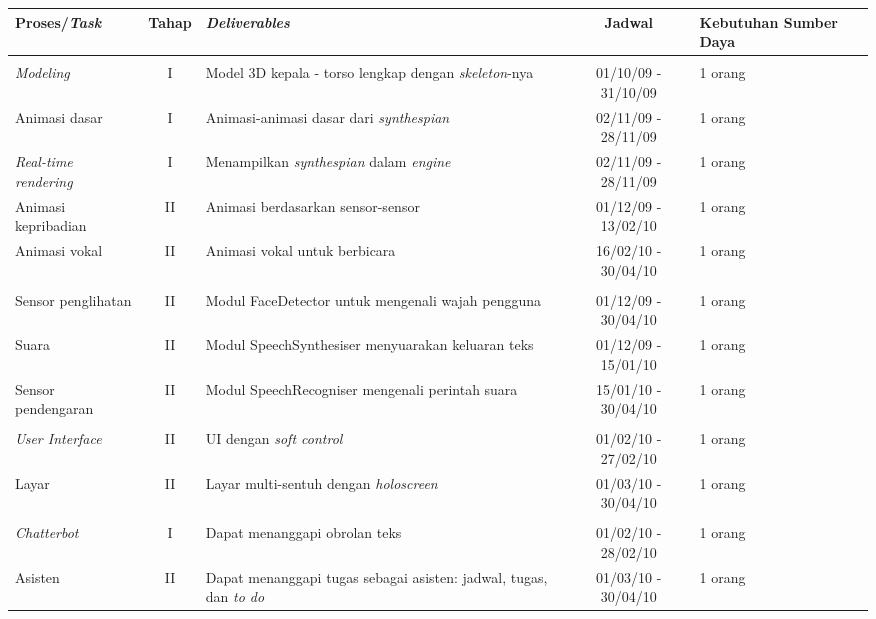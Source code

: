 \begin{table}
	\centering
		\begin{tabular}{|>{\small}l|>{\small}c|>{\small}p{4cm}|>{\small}c|>{\small}p{2cm}|}
		\hline
			\textbf{Proses\slash \textit{Task}} & 		\textbf{Tahap} & \textbf{\textit{Deliverables}} & \textbf{Jadwal} & \textbf{Kebutuhan Sumber Daya}\\
		\hline
			\multicolumn{5}{|>{\small}c|}{\textbf{\textit{Synthespian}}}\\
		\hline
			\textit{Modeling} & I & Model 3D kepala - torso lengkap dengan \textit{skeleton}-nya & 01/10/09 - 31/10/09 & 1 orang\\
		\hline
			Animasi dasar & I & Animasi-animasi dasar dari \textit{synthespian} & 02/11/09 - 28/11/09 & 1 orang\\
		\hline
			\textit{Real-time rendering} & I & Menampilkan \textit{synthespian} dalam \textit{engine} & 02/11/09 - 28/11/09 & 1 orang\\
		\hline
			Animasi kepribadian & II & Animasi berdasarkan sensor-sensor & 01/12/09 - 13/02/10 & 1 orang\\
		\hline
			Animasi vokal & II & Animasi vokal untuk berbicara & 16/02/10 - 30/04/10 & 1 orang\\
		\hline
			\multicolumn{5}{|>{\small}c|}{\textbf{Sensor dan Suara}}\\
		\hline
	Sensor penglihatan & II & Modul FaceDetector untuk mengenali wajah pengguna & 01/12/09 - 30/04/10 & 1 orang\\
		\hline
			Suara & II & Modul SpeechSynthesiser menyuarakan keluaran teks & 01/12/09 - 15/01/10 & 1 orang\\
		\hline
			Sensor pendengaran & II & Modul SpeechRecogniser mengenali perintah suara & 15/01/10 - 30/04/10 & 1 orang\\
		\hline
			\multicolumn{5}{|>{\small}c|}{\textbf{Antarmuka \textit{Soft Machine}}}\\
		\hline
			\textit{User Interface} & II & UI dengan \textit{soft control} & 01/02/10 - 27/02/10 & 1 orang\\
		\hline
			Layar & II & Layar multi-sentuh dengan 		\textit{holoscreen} & 01/03/10 - 30/04/10 & 1 orang\\
		\hline
			\multicolumn{5}{|>{\small}c|}{\textbf{\textit{Server}}}\\
		\hline
			\textit{Chatterbot} & I & Dapat menanggapi obrolan teks & 01/02/10 - 28/02/10 & 1 orang\\
		\hline
			Asisten & II & Dapat menanggapi tugas sebagai asisten: jadwal, tugas, dan \textit{to do} & 01/03/10 - 30/04/10 & 1 orang\\

\end{tabular}
\end{table}

